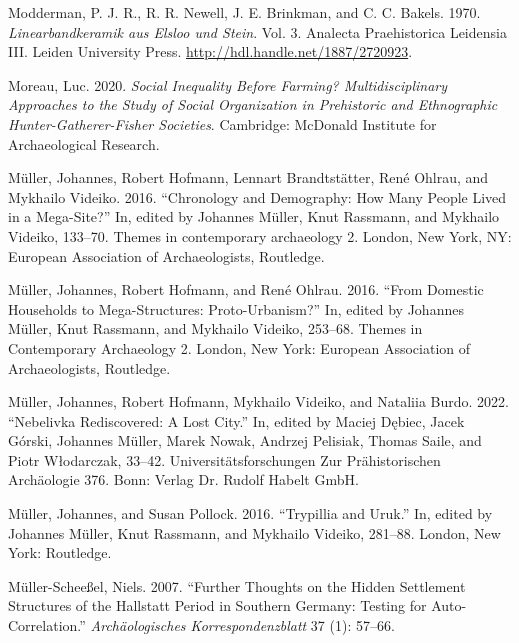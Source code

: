 \documentclass[
  12pt,
  a4paper, twoside]{book}
\newlength{\cslhangindent}
\newlength{\cslentryspacingunit} %
\newenvironment{CSLReferences}[2] %
 {%
  \setlength{\parindent}{0pt}
  \ifodd #1
  \let\oldpar\par
  \def\par{\hangindent=\cslhangindent\oldpar}
  \fi
  \setlength{\parskip}{#2\cslentryspacingunit}
 }%
 {}
\begin{document}
\begin{CSLReferences}{1}{0}
\leavevmode{}%
Modderman, P. J. R., R. R. Newell, J. E. Brinkman, and C. C. Bakels. 1970. \emph{Linearbandkeramik aus Elsloo und Stein}. Vol. 3. Analecta Praehistorica Leidensia III. Leiden University Press. \url{http://hdl.handle.net/1887/2720923}.

\leavevmode{}%
Moreau, Luc. 2020. \emph{Social Inequality Before Farming? Multidisciplinary Approaches to the Study of Social Organization in Prehistoric and Ethnographic Hunter-Gatherer-Fisher Societies}. Cambridge: McDonald Institute for Archaeological Research.

\leavevmode{}%
Müller, Johannes, Robert Hofmann, Lennart Brandtstätter, René Ohlrau, and Mykhailo Videiko. 2016. {``Chronology and Demography: How Many People Lived in a Mega-Site?''} In, edited by Johannes Müller, Knut Rassmann, and Mykhailo Videiko, 133--70. Themes in contemporary archaeology 2. London, New York, NY: European Association of Archaeologists, Routledge.

\leavevmode{}%
Müller, Johannes, Robert Hofmann, and René Ohlrau. 2016. {``From Domestic Households to Mega-Structures: Proto-Urbanism?''} In, edited by Johannes Müller, Knut Rassmann, and Mykhailo Videiko, 253--68. Themes in Contemporary Archaeology 2. London, New York: European Association of Archaeologists, Routledge.

\leavevmode{}%
Müller, Johannes, Robert Hofmann, Mykhailo Videiko, and Nataliia Burdo. 2022. {``Nebelivka {\textendash} Rediscovered: A Lost City.''} In, edited by Maciej Dębiec, Jacek Górski, Johannes Müller, Marek Nowak, Andrzej Pelisiak, Thomas Saile, and Piotr Włodarczak, 33--42. Universitätsforschungen Zur Prähistorischen Archäologie 376. Bonn: Verlag Dr. Rudolf Habelt GmbH.

\leavevmode{}%
Müller, Johannes, and Susan Pollock. 2016. {``Trypillia and Uruk.''} In, edited by Johannes Müller, Knut Rassmann, and Mykhailo Videiko, 281--88. London, New York: Routledge.

\leavevmode{}%
Müller-Scheeßel, Niels. 2007. {``Further Thoughts on the Hidden Settlement Structures of the Hallstatt Period in Southern Germany: Testing for Auto-Correlation.''} \emph{Archäologisches Korrespondenzblatt} 37 (1): 57--66.


\end{CSLReferences}
\end{document}
